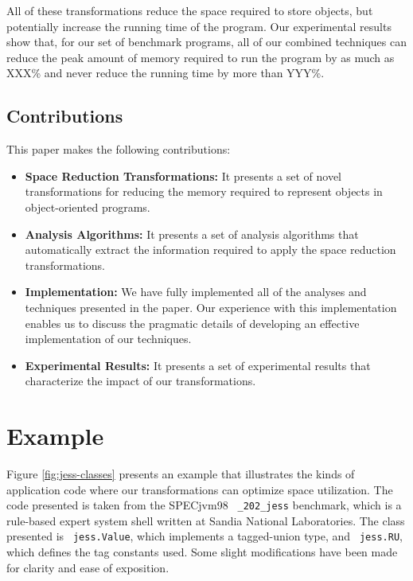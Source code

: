 \documentclass[preprint]{acmconf}
\begin{document}
All of these transformations reduce the space required to store
objects, but potentially increase the running time of the program.
Our experimental results show that, for our set of benchmark
programs, all of our combined techniques can reduce the peak amount of memory
required to run the program by as much as XXX\% and never reduce the
running time by more than YYY\%.

\subsection{Contributions}

This paper makes the following contributions:
\begin{itemize}
\item {\bf Space Reduction Transformations:} It presents a set
of novel transformations for reducing the memory required to 
represent objects in object-oriented programs.

\item {\bf Analysis Algorithms:} It presents a set of 
analysis algorithms that automatically extract the 
information required to apply the space reduction 
transformations.

\item {\bf Implementation:} We have fully 
implemented all of the analyses and techniques 
presented in the paper. Our experience with this
implementation enables us to discuss the pragmatic
details of developing an effective implementation 
of our techniques. 

\item {\bf Experimental Results:} It presents a set
of experimental results that characterize the impact
of our transformations. 
\end{itemize}

\section{Example}
Figure \ref{fig:jess-classes} presents an example that illustrates the
kinds of application code where our transformations can optimize space
utilization.  The code presented is taken from the SPECjvm98 {\tt
  \_202\_jess} benchmark, which is a rule-based expert system shell
written at Sandia National Laboratories.  The class presented is {\tt
  jess.Value}, which implements a tagged-union type, and {\tt
  jess.RU}, which defines the tag constants used.  Some slight
modifications have been made for clarity and ease of exposition.
\end{document}
